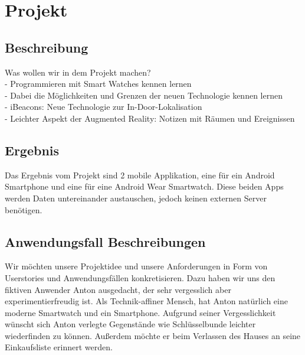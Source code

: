 



\setcounter{secnumdepth}{3}
\setcounter{tocdepth}{2}

\pagestyle{empty}


\tableofcontents
\setcounter{page}{1}

\pagestyle{scrheadings}

\newpage

\section{Projekt}

\subsection{Beschreibung}
Was wollen wir in dem Projekt machen?
\\- Programmieren mit Smart Watches kennen lernen
\\- Dabei die Möglichkeiten und Grenzen der neuen Technologie kennen lernen
\\- iBeacons: Neue Technologie zur In-Door-Lokalisation
\\- Leichter Aspekt der Augmented Reality: Notizen mit Räumen und Ereignissen 

\subsection{Ergebnis}
Das Ergebnis vom Projekt sind 2 mobile Applikation, eine für ein Android Smartphone und eine für eine Android Wear Smartwatch. Diese beiden Apps werden Daten untereinander austauschen, jedoch keinen externen Server benötigen.

\subsection{Anwendungsfall Beschreibungen}
Wir möchten unsere Projektidee und unsere Anforderungen in Form von Userstories und Anwendungsfällen konkretisieren. Dazu haben wir uns den fiktiven Anwender Anton ausgedacht, der sehr vergesslich aber experimentierfreudig ist. Als Technik-affiner Mensch, hat Anton natürlich eine moderne Smartwatch und ein Smartphone. Aufgrund seiner Vergesslichkeit wünscht sich Anton verlegte Gegenstände wie Schlüsselbunde leichter wiederfinden zu können. Außerdem möchte er beim Verlassen des Hauses an seine Einkaufsliste erinnert werden.

